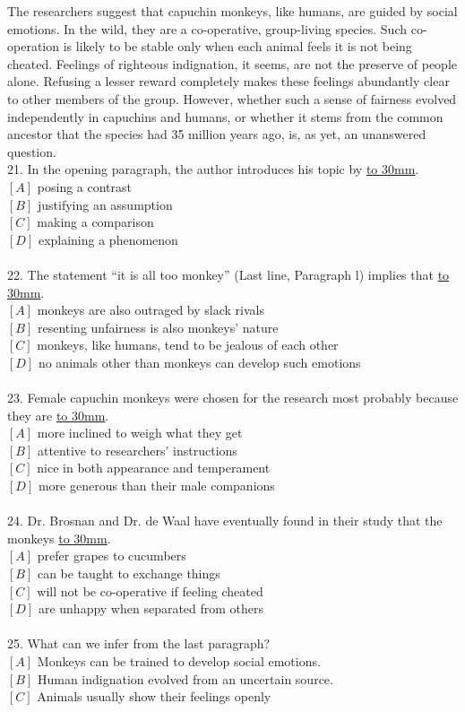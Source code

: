 \documentclass[a4paper]{article}
\begin{document}
\par
The researchers suggest that capuchin monkeys, like humans, are guided by social emotions. In the wild, they are a co-operative, group-living species. Such co-operation is likely to be stable only when each animal feels it is not being cheated. Feelings of righteous indignation, it seems, are not the preserve of people alone. Refusing a lesser reward completely makes these feelings abundantly clear to other members of the group. However, whether such a sense of fairness evolved independently in capuchins and humans, or whether it stems from the common ancestor that the species had 35 million years ago, is, as yet, an unanswered question.
\\21.	In the opening paragraph, the author introduces his topic by \underline{\hbox to 30mm{}}.\\$[A]$ posing a contrast\\$[B]$ justifying an assumption\\$[C]$ making a comparison\\$[D]$ explaining a phenomenon\\\\22.	The statement “it is all too monkey” (Last line, Paragraph l) implies that \underline{\hbox to 30mm{}}.\\$[A]$ monkeys are also outraged by slack rivals\\$[B]$ resenting unfairness is also monkeys’ nature\\$[C]$ monkeys, like humans, tend to be jealous of each other\\$[D]$ no animals other than monkeys can develop such emotions\\\\23.	Female capuchin monkeys were chosen for the research most probably because they are \underline{\hbox to 30mm{}}.\\$[A]$ more inclined to weigh what they get\\$[B]$ attentive to researchers’ instructions\\$[C]$ nice in both appearance and temperament\\$[D]$ more generous than their male companions\\\\24.	Dr. Brosnan and Dr. de Waal have eventually found in their study that the monkeys \underline{\hbox to 30mm{}}.\\$[A]$ prefer grapes to cucumbers\\$[B]$ can be taught to exchange things\\$[C]$ will not be co-operative if feeling cheated\\$[D]$ are unhappy when separated from others\\\\25.	What can we infer from the last paragraph?\\$[A]$ Monkeys can be trained to develop social emotions.\\$[B]$ Human indignation evolved from an uncertain source.\\$[C]$ Animals usually show their feelings openly 
\end{document}
